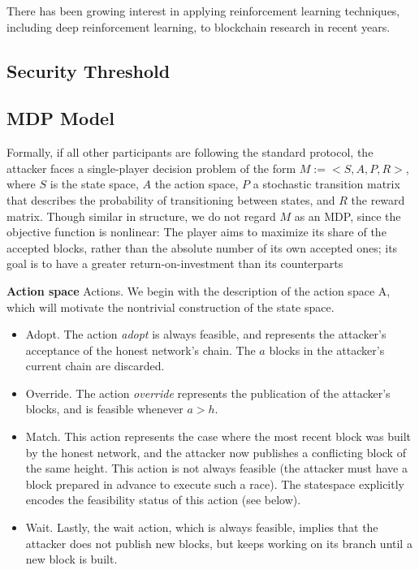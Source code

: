 There has been growing interest in applying reinforcement learning techniques, including deep reinforcement learning, to blockchain research in recent years.

\subsection{Security Threshold}



\subsection{MDP Model}
Formally, if all other participants are following the standard protocol, the attacker faces a single-player decision problem of the form $M := <S, A, P, R>$, where $S$ is the state space, $A$ the action space, $P$ a stochastic transition matrix that describes the probability of transitioning between states, and $R$ the reward matrix. Though similar in structure, we do not regard $M$ as an MDP, since the objective function is nonlinear: The player aims to maximize its share of the accepted blocks, rather than the absolute number of its own accepted ones; its goal is to have a greater return-on-investment than its counterparts

\textbf{Action space}
Actions. We begin with the description of the action space A, which will motivate the nontrivial construction of the state space.
\begin{itemize}
    \item Adopt. The action \emph{adopt} is always feasible, and represents the attacker’s acceptance of the honest network’s chain. The $a$ blocks in the attacker’s current chain are discarded.
    \item Override. The action \emph{override} represents the publication of the attacker’s blocks, and is feasible whenever $a > h$.
    \item Match. This action represents the case where the most recent block was built by the honest network, and the attacker now publishes a conflicting block of the same height. This action is not always feasible (the attacker must have a block prepared in advance to execute such a race). The statespace explicitly encodes the feasibility status of this action (see below).
    \item Wait. Lastly, the wait action, which is always feasible, implies that the attacker does not publish new blocks, but keeps working on its branch until a new block is built.
\end{itemize}

